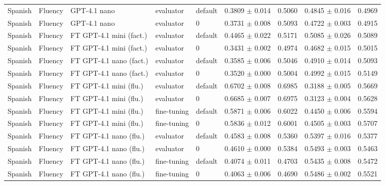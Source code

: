 \begin{tabular}{lllllcccc}
Spanish & Fluency & GPT-4.1 nano & evaluator & default & 0.3809 $\pm$ 0.014 & 0.5060 & 0.4845 $\pm$ 0.016 & 0.4969 \\
Spanish & Fluency & GPT-4.1 nano & evaluator & 0 & 0.3731 $\pm$ 0.008 & 0.5093 & 0.4722 $\pm$ 0.003 & 0.4915 \\
Spanish & Fluency & FT GPT-4.1 mini (fact.) & evaluator & default & 0.4465 $\pm$ 0.022 & 0.5171 & 0.5085 $\pm$ 0.026 & 0.5089 \\
Spanish & Fluency & FT GPT-4.1 mini (fact.) & evaluator & 0 & 0.3431 $\pm$ 0.002 & 0.4974 & 0.4682 $\pm$ 0.015 & 0.5015 \\
Spanish & Fluency & FT GPT-4.1 nano (fact.) & evaluator & default & 0.3585 $\pm$ 0.006 & 0.5046 & 0.4910 $\pm$ 0.014 & 0.5093 \\
Spanish & Fluency & FT GPT-4.1 nano (fact.) & evaluator & 0 & 0.3520 $\pm$ 0.000 & 0.5004 & 0.4992 $\pm$ 0.015 & 0.5149 \\
Spanish & Fluency & FT GPT-4.1 mini (flu.) & evaluator & default & 0.6702 $\pm$ 0.008 & 0.6985 & 0.3188 $\pm$ 0.005 & 0.5669 \\
Spanish & Fluency & FT GPT-4.1 mini (flu.) & evaluator & 0 & 0.6685 $\pm$ 0.007 & 0.6975 & 0.3123 $\pm$ 0.004 & 0.5628 \\
Spanish & Fluency & FT GPT-4.1 mini (flu.) & fine-tuning & default & 0.5871 $\pm$ 0.006 & 0.6022 & 0.4450 $\pm$ 0.006 & 0.5594 \\
Spanish & Fluency & FT GPT-4.1 mini (flu.) & fine-tuning & 0 & 0.5836 $\pm$ 0.012 & 0.6001 & 0.4505 $\pm$ 0.003 & 0.5707 \\
Spanish & Fluency & FT GPT-4.1 nano (flu.) & evaluator & default & 0.4583 $\pm$ 0.008 & 0.5360 & 0.5397 $\pm$ 0.016 & 0.5377 \\
Spanish & Fluency & FT GPT-4.1 nano (flu.) & evaluator & 0 & 0.4610 $\pm$ 0.000 & 0.5384 & 0.5493 $\pm$ 0.003 & 0.5463 \\
Spanish & Fluency & FT GPT-4.1 nano (flu.) & fine-tuning & default & 0.4074 $\pm$ 0.011 & 0.4703 & 0.5435 $\pm$ 0.008 & 0.5472 \\
Spanish & Fluency & FT GPT-4.1 nano (flu.) & fine-tuning & 0 & 0.4063 $\pm$ 0.006 & 0.4690 & 0.5486 $\pm$ 0.002 & 0.5521 \\
\hline
\end{tabular}

